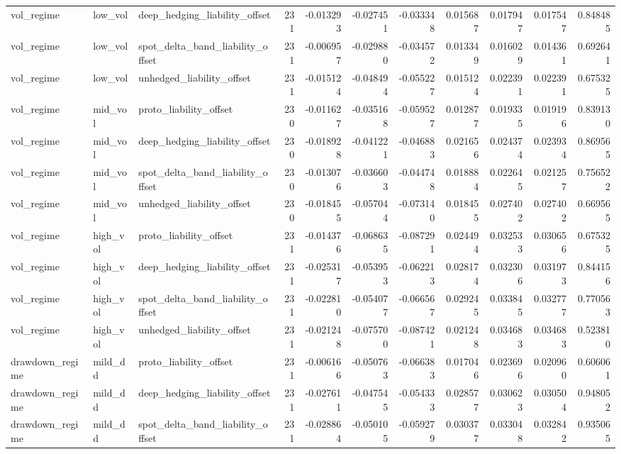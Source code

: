 \begin{tabular}{lllrrrrrrrr}
vol\_regime & low\_vol & deep\_hedging\_liability\_offset & 231 & -0.013293 & -0.027451 & -0.033348 & 0.015687 & 0.017947 & 0.017547 & 0.848485 \\
vol\_regime & low\_vol & spot\_delta\_band\_liability\_offset & 231 & -0.006957 & -0.029880 & -0.034572 & 0.013349 & 0.016029 & 0.014361 & 0.692641 \\
vol\_regime & low\_vol & unhedged\_liability\_offset & 231 & -0.015124 & -0.048494 & -0.055227 & 0.015124 & 0.022391 & 0.022391 & 0.675325 \\
vol\_regime & mid\_vol & proto\_liability\_offset & 230 & -0.011627 & -0.035168 & -0.059527 & 0.012877 & 0.019335 & 0.019196 & 0.839130 \\
vol\_regime & mid\_vol & deep\_hedging\_liability\_offset & 230 & -0.018928 & -0.041221 & -0.046883 & 0.021656 & 0.024374 & 0.023934 & 0.869565 \\
vol\_regime & mid\_vol & spot\_delta\_band\_liability\_offset & 230 & -0.013076 & -0.036603 & -0.044748 & 0.018884 & 0.022645 & 0.021257 & 0.756522 \\
vol\_regime & mid\_vol & unhedged\_liability\_offset & 230 & -0.018455 & -0.057044 & -0.073140 & 0.018455 & 0.027402 & 0.027402 & 0.669565 \\
vol\_regime & high\_vol & proto\_liability\_offset & 231 & -0.014376 & -0.068635 & -0.087291 & 0.024494 & 0.032533 & 0.030656 & 0.675325 \\
vol\_regime & high\_vol & deep\_hedging\_liability\_offset & 231 & -0.025317 & -0.053953 & -0.062213 & 0.028174 & 0.032306 & 0.031973 & 0.844156 \\
vol\_regime & high\_vol & spot\_delta\_band\_liability\_offset & 231 & -0.022810 & -0.054077 & -0.066567 & 0.029245 & 0.033845 & 0.032777 & 0.770563 \\
vol\_regime & high\_vol & unhedged\_liability\_offset & 231 & -0.021248 & -0.075700 & -0.087421 & 0.021248 & 0.034683 & 0.034683 & 0.523810 \\
drawdown\_regime & mild\_dd & proto\_liability\_offset & 231 & -0.006166 & -0.050763 & -0.066383 & 0.017046 & 0.023696 & 0.020960 & 0.606061 \\
drawdown\_regime & mild\_dd & deep\_hedging\_liability\_offset & 231 & -0.027611 & -0.047545 & -0.054333 & 0.028577 & 0.030623 & 0.030504 & 0.948052 \\
drawdown\_regime & mild\_dd & spot\_delta\_band\_liability\_offset & 231 & -0.028864 & -0.050105 & -0.059279 & 0.030377 & 0.033048 & 0.032842 & 0.935065 \\

\end{tabular}
